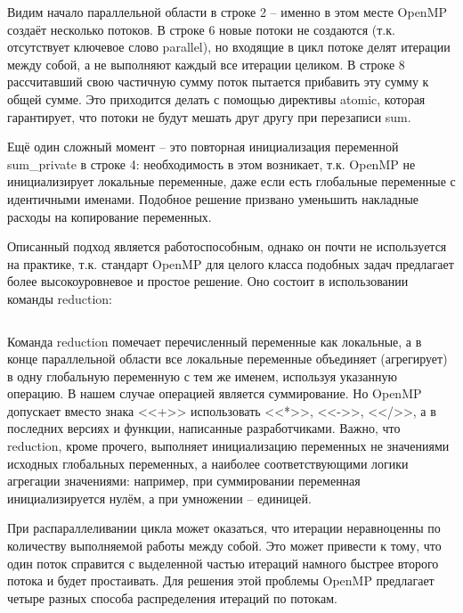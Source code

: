 \inputminted{c++}{listings/OpenMPExample11.cpp}

Видим начало параллельной области в строке 2 – именно в этом месте OpenMP создаёт несколько потоков. В строке 6 новые потоки не создаются (т.к. отсутствует ключевое слово parallel), но входящие в цикл потоке делят итерации между собой, а не выполняют каждый все итерации целиком. В строке 8 рассчитавший свою частичную сумму поток пытается прибавить эту сумму к общей сумме. Это приходится делать с помощью директивы atomic, которая гарантирует, что потоки не будут мешать друг другу при перезаписи sum. 

Ещё один сложный момент – это повторная инициализация переменной sum\_private в строке 4: необходимость в этом возникает, т.к. OpenMP не инициализирует локальные переменные, даже если есть глобальные переменные с идентичными именами. Подобное решение призвано уменьшить накладные расходы на копирование переменных.

Описанный подход является работоспособным, однако он почти не используется на практике, т.к. стандарт OpenMP для целого класса подобных задач предлагает более высокоуровневое и простое решение. Оно состоит в использовании команды reduction:

\inputminted{c++}{listings/OpenMPExample12.cpp}

Команда reduction помечает перечисленный переменные как локальные, а в конце параллельной области все локальные переменные объединяет (агрегирует) в одну глобальную переменную с тем же именем, используя указанную операцию. В нашем случае операцией является суммирование. Но OpenMP допускает вместо знака <<+>> использовать <<*>>, <<->>, <</>>, а в последних версиях и функции, написанные разработчиками. Важно, что reduction, кроме прочего, выполняет инициализацию переменных не значениями исходных глобальных переменных, а наиболее соответствующими логики агрегации значениями: например, при суммировании переменная инициализируется нулём, а при умножении – единицей.

При распараллеливании цикла может оказаться, что итерации не\-рав\-но\-цен\-ны по количеству выполняемой работы между собой. Это может привести к тому, что один поток справится с выделенной частью итераций намного быстрее второго потока и будет простаивать. Для решения этой проблемы OpenMP предлагает четыре разных способа распределения итераций по потокам. 

